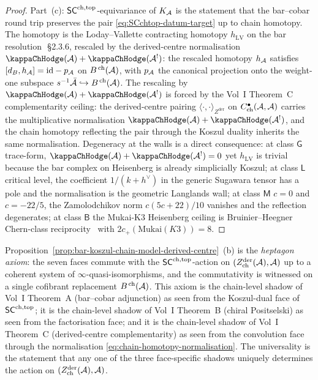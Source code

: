 \begin{proof}
Part~(c): $\mathsf{SC}^{\mathrm{ch},\mathrm{top}}$-equivariance of $K_{\mathcal{A}}$ is the statement
that the bar--cobar round trip preserves the pair
\eqref{eq:SCchtop-datum-target} up to chain homotopy. The
homotopy is the Loday--Vallette contracting homotopy
$h_{\mathrm{LV}}$ on the bar resolution~\cite{LV12}\,\S2.3.6,
rescaled by the derived-centre normalisation
$\kappaChHodge(\cA)+\kappaChHodge(\cA^!)$: the rescaled homotopy $h_{\mathcal{A}}$ satisfies
$[d_B, h_{\mathcal{A}}]=\mathrm{id}-p_{\mathcal{A}}$ on $B^{\,\mathrm{ch}}(\mathcal{A})$, with
$p_{\mathcal{A}}$ the canonical projection onto the weight-one subspace
$s^{-1}\bar{\mathcal{A}}\hookrightarrow B^{\,\mathrm{ch}}(\mathcal{A})$. The
rescaling by $\kappaChHodge(\cA)+\kappaChHodge(\cA^!)$ is forced by the Vol~I
Theorem~C complementarity ceiling: the derived-centre pairing
$\langle\cdot,\cdot\rangle_{Z^{\mathrm{der}}}$ on
$C^{\bullet}_{\mathrm{ch}}(\mathcal{A},\mathcal{A})$ carries the multiplicative
normalisation $\kappaChHodge(\cA)+\kappaChHodge(\cA^!)$, and the chain homotopy
reflecting the pair through the Koszul duality inherits the
same normalisation. Degeneracy at the walls is a direct
consequence: at class $\mathsf G$ trace-form, $\kappaChHodge(\cA)+\kappaChHodge(\cA^!)=0$
yet $h_{\mathrm{LV}}$ is trivial because the bar complex on
Heisenberg is already simplicially Koszul; at class $\mathsf L$
critical level, the coefficient $1/(k+h^\vee)$ in the generic
Sugawara tensor has a pole and the normalisation is the geometric
Langlands wall; at
class $\mathsf M$ $c=0$ and $c=-22/5$, the Zamolodchikov norm
$c(5c+22)/10$ vanishes and the reflection degenerates; at
class $\mathsf B$ the Mukai-K3 Heisenberg ceiling is
Bruinier--Heegner Chern-class reciprocity~\cite{Bruinier2002}
with $2c_{+}(\mathrm{Mukai}(K3))=8$.
\end{proof}

\begin{remark}\label{rem:heptagon-axiom-universal}%
Proposition~\ref{prop:bar-koszul-chain-model-derived-centre}~(b)
is the \emph{heptagon axiom}: the seven faces commute with the
$\mathsf{SC}^{\mathrm{ch},\mathrm{top}}$-action on $(Z^{\mathrm{der}}_{\mathrm{ch}}(\mathcal{A}),\mathcal{A})$
up to a coherent system of $\infty$-quasi-isomorphisms, and the
commutativity is witnessed on a single cofibrant replacement
$B^{\,\mathrm{ch}}(\mathcal{A})$. This axiom is the chain-level shadow
of Vol~I Theorem~A (bar--cobar adjunction) as seen from the
Koszul-dual face of $\mathsf{SC}^{\mathrm{ch},\mathrm{top}}$; it is the chain-level shadow
of Vol~I Theorem~B (chiral Positselski) as seen from the
factorisation face; and it is the chain-level shadow of
Vol~I Theorem~C (derived-centre complementarity) as seen from
the convolution face through the normalisation
\eqref{eq:chain-homotopy-normalisation}. The universality is the
statement that any one of the three face-specific shadows
uniquely determines the action on
$(Z^{\mathrm{der}}_{\mathrm{ch}}(\mathcal{A}),\mathcal{A})$.
\end{remark}

